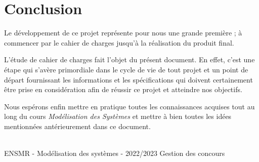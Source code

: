 \section{Conclusion}

Le développement de ce projet représente pour nous une grande première ; à commencer par le cahier de charges jusqu'à la réalisation du produit final.\par
L’étude de cahier de charges fait l'objet du présent document. En effet, c'est une étape qui s'avère  primordiale dans le cycle de vie de tout projet et un point de départ fournissant les informations et les spécifications qui doivent certainement être prise en considération afin de réussir ce projet et atteindre nos objectifs.\par

 Nous espérons enfin mettre en pratique toutes les connaissances acquises tout au long du cours \emph{Modélisation des Systèmes} et mettre à bien toutes les idées mentionnées antérieurement dans ce document. 


\vfill
\noindent\makebox[\linewidth]{\rule{.8\paperwidth}{.6pt}}\\[0.2cm]
ENSMR - Modélisation des systèmes - 2022/2023 \hfill Gestion des concours
\noindent\makebox[\linewidth]{\rule{.8\paperwidth}{.6pt}}

\newpage